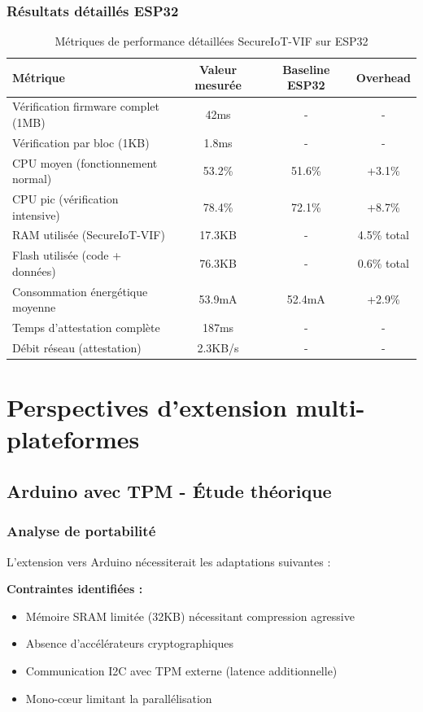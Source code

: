 \subsubsection{Résultats détaillés ESP32}

\begin{table}[h]
\centering
\caption{Métriques de performance détaillées SecureIoT-VIF sur ESP32}
\label{tab:esp32-performance-metrics}
\begin{tabular}{|l|c|c|c|}
\hline
\textbf{Métrique} & \textbf{Valeur mesurée} & \textbf{Baseline ESP32} & \textbf{Overhead} \\
\hline
Vérification firmware complet (1MB) & 42ms & - & - \\
Vérification par bloc (1KB) & 1.8ms & - & - \\
CPU moyen (fonctionnement normal) & 53.2\% & 51.6\% & +3.1\% \\
CPU pic (vérification intensive) & 78.4\% & 72.1\% & +8.7\% \\
RAM utilisée (SecureIoT-VIF) & 17.3KB & - & 4.5\% total \\
Flash utilisée (code + données) & 76.3KB & - & 0.6\% total \\
Consommation énergétique moyenne & 53.9mA & 52.4mA & +2.9\% \\
Temps d'attestation complète & 187ms & - & - \\
Débit réseau (attestation) & 2.3KB/s & - & - \\
\hline
\end{tabular}
\end{table}

\section{Perspectives d'extension multi-plateformes}

\subsection{Arduino avec TPM - Étude théorique}

\subsubsection{Analyse de portabilité}

L'extension vers Arduino nécessiterait les adaptations suivantes :

\textbf{Contraintes identifiées :}
\begin{itemize}
    \item Mémoire SRAM limitée (32KB) nécessitant compression agressive
    \item Absence d'accélérateurs cryptographiques
    \item Communication I2C avec TPM externe (latence additionnelle)
    \item Mono-cœur limitant la parallélisation
\end{itemize}

